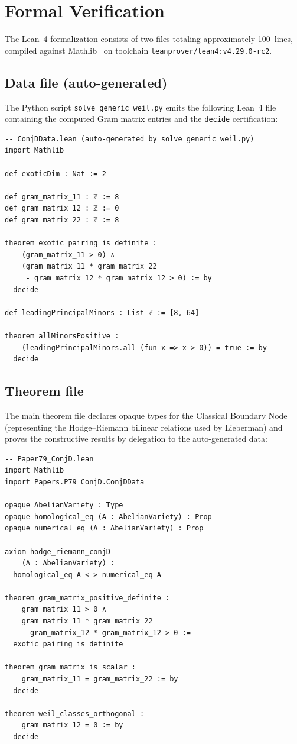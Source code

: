 \documentclass[11pt]{article}
\theoremstyle{plain}
\theoremstyle{definition}
\theoremstyle{remark}
\begin{document}
\section{Formal Verification}
\label{sec:lean}

The Lean~4 formalization consists of two files totaling approximately
100~lines, compiled against Mathlib~\cite{mathlib4} on toolchain
\texttt{leanprover/lean4:v4.29.0-rc2}.

\subsection{Data file (auto-generated)}

The Python script \texttt{solve\_generic\_weil.py} emits the following
Lean~4 file containing the computed Gram matrix entries and the
\texttt{decide} certification:

\begin{lstlisting}
-- ConjDData.lean (auto-generated by solve_generic_weil.py)
import Mathlib

def exoticDim : Nat := 2

def gram_matrix_11 : ℤ := 8
def gram_matrix_12 : ℤ := 0
def gram_matrix_22 : ℤ := 8

theorem exotic_pairing_is_definite :
    (gram_matrix_11 > 0) ∧
    (gram_matrix_11 * gram_matrix_22
     - gram_matrix_12 * gram_matrix_12 > 0) := by
  decide

def leadingPrincipalMinors : List ℤ := [8, 64]

theorem allMinorsPositive :
    (leadingPrincipalMinors.all (fun x => x > 0)) = true := by
  decide
\end{lstlisting}

\subsection{Theorem file}

The main theorem file declares opaque types for the Classical Boundary Node
(representing the Hodge--Riemann bilinear relations used by Lieberman) and
proves the constructive results by delegation to the auto-generated data:

\begin{lstlisting}
-- Paper79_ConjD.lean
import Mathlib
import Papers.P79_ConjD.ConjDData

opaque AbelianVariety : Type
opaque homological_eq (A : AbelianVariety) : Prop
opaque numerical_eq (A : AbelianVariety) : Prop

axiom hodge_riemann_conjD
    (A : AbelianVariety) :
  homological_eq A <-> numerical_eq A

theorem gram_matrix_positive_definite :
    gram_matrix_11 > 0 ∧
    gram_matrix_11 * gram_matrix_22
    - gram_matrix_12 * gram_matrix_12 > 0 :=
  exotic_pairing_is_definite

theorem gram_matrix_is_scalar :
    gram_matrix_11 = gram_matrix_22 := by
  decide

theorem weil_classes_orthogonal :
    gram_matrix_12 = 0 := by
  decide
\end{lstlisting}
\end{document}

